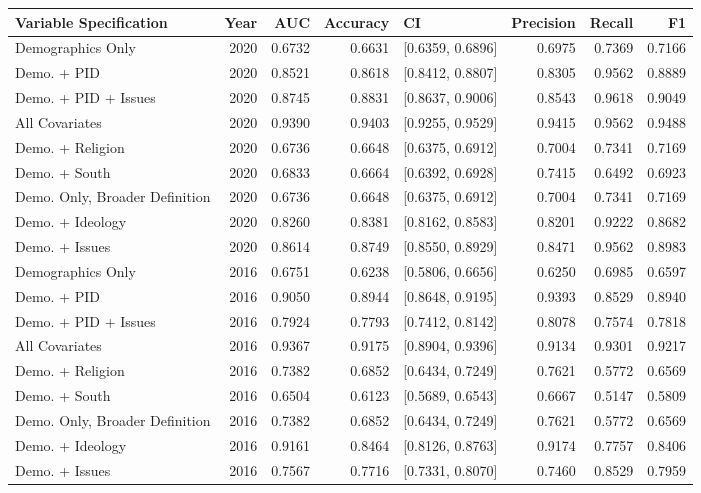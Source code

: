 \begin{longtable}{lrrrlrrr}
  \toprule
Variable Specification & Year & AUC & Accuracy & CI & Precision & Recall & F1 \\ 
  \midrule
Demographics Only & 2020 & 0.6732 & 0.6631 & [0.6359, 0.6896] & 0.6975 & 0.7369 & 0.7166 \\ 
  Demo. + PID & 2020 & 0.8521 & 0.8618 & [0.8412, 0.8807] & 0.8305 & 0.9562 & 0.8889 \\ 
  Demo. + PID + Issues & 2020 & 0.8745 & 0.8831 & [0.8637, 0.9006] & 0.8543 & 0.9618 & 0.9049 \\ 
  All Covariates & 2020 & 0.9390 & 0.9403 & [0.9255, 0.9529] & 0.9415 & 0.9562 & 0.9488 \\ 
  Demo. + Religion & 2020 & 0.6736 & 0.6648 & [0.6375, 0.6912] & 0.7004 & 0.7341 & 0.7169 \\ 
  Demo. + South & 2020 & 0.6833 & 0.6664 & [0.6392, 0.6928] & 0.7415 & 0.6492 & 0.6923 \\ 
  Demo. Only, Broader Definition & 2020 & 0.6736 & 0.6648 & [0.6375, 0.6912] & 0.7004 & 0.7341 & 0.7169 \\ 
  Demo. + Ideology & 2020 & 0.8260 & 0.8381 & [0.8162, 0.8583] & 0.8201 & 0.9222 & 0.8682 \\ 
  Demo. + Issues & 2020 & 0.8614 & 0.8749 & [0.8550, 0.8929] & 0.8471 & 0.9562 & 0.8983 \\ 
  Demographics Only & 2016 & 0.6751 & 0.6238 & [0.5806, 0.6656] & 0.6250 & 0.6985 & 0.6597 \\ 
  Demo. + PID & 2016 & 0.9050 & 0.8944 & [0.8648, 0.9195] & 0.9393 & 0.8529 & 0.8940 \\ 
  Demo. + PID + Issues & 2016 & 0.7924 & 0.7793 & [0.7412, 0.8142] & 0.8078 & 0.7574 & 0.7818 \\ 
  All Covariates & 2016 & 0.9367 & 0.9175 & [0.8904, 0.9396] & 0.9134 & 0.9301 & 0.9217 \\ 
  Demo. + Religion & 2016 & 0.7382 & 0.6852 & [0.6434, 0.7249] & 0.7621 & 0.5772 & 0.6569 \\ 
  Demo. + South & 2016 & 0.6504 & 0.6123 & [0.5689, 0.6543] & 0.6667 & 0.5147 & 0.5809 \\ 
  Demo. Only, Broader Definition & 2016 & 0.7382 & 0.6852 & [0.6434, 0.7249] & 0.7621 & 0.5772 & 0.6569 \\ 
  Demo. + Ideology & 2016 & 0.9161 & 0.8464 & [0.8126, 0.8763] & 0.9174 & 0.7757 & 0.8406 \\ 
  Demo. + Issues & 2016 & 0.7567 & 0.7716 & [0.7331, 0.8070] & 0.7460 & 0.8529 & 0.7959 \\ 

\end{longtable}
